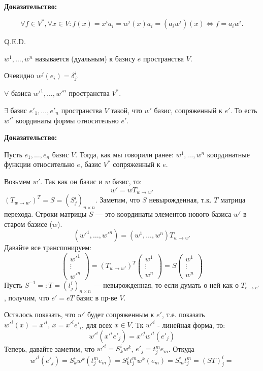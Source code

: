 \textbf{Доказательство:}

$$\forall f \in V^*, \forall x \in V: f(x) = x^ia_i = w^i(x)a_i = (a_iw^i)(x) \Leftrightarrow f = a_iw^i.$$

\hfill Q.E.D.


 $w^1,\ldots, w^n$ называется  (дуальным) к базису $e$ пространства $V$.

Очевидно $w^j(e_i) = \delta^i_j$.


$\forall$ базиса $w'^1,\ldots, w'^n$ пространства $V^*$.

$\exists$ базис $e'_1, \ldots, e'_n$ пространства $V$ такой, что $w'$ базис, сопряженный к $e'$. То есть $w'^{i} $ координаты формы относительно $e'$.

\textbf{Доказательство:}


Пусть $e_1,\dots ,e_n \text{ базис } V$. Тогда, как мы говорили ранее:
$ w^1,\dots,w^n $ координатные функции относительно $e$, базис $V^*$ сопряженный к $e$.

Возьмем $w'$. Так как он базис и $w$ базис, то: $$ w' =wT_{w \rightarrow w'}$$
$(T_{w \to w'})^T=S=(S^i_j)_{n\times n}$. Заметим, что $S$ невырожденная, т.к. $T$ матрица перехода. Строки матрицы $S$ --- это координаты элементов нового базиса $w'$ в старом базисе ($w$).
$$(w'^1,\ldots,w'^n)=(w^1,\ldots,w^n)T_{w \to w'}$$
Давайте все транспонируем:
$$\begin{pmatrix}
    w'^1 \\
    \vdots \\
    {w'}^n
\end{pmatrix} = (T_{w \to w'})^T \begin{pmatrix}
    w^1 \\
    \vdots \\
    {w}^n
\end{pmatrix}= S \begin{pmatrix}
    w^1 \\
    \vdots \\
    {w}^n
\end{pmatrix}$$
Пусть $S^{-1}=:T=(t^i_j)_{n \times n}$ --- невырожденная, то если думать о ней как о $T_{e \to e'}$, получим, что $ e' = eT$ базис в пр-ве $V$.

Осталось показать, что $w'$ будет сопряженным к $e'$, т.е. показать ${w'}^{ i}(x)={x'}^i, \, x = {x'}^i {e'}_i$, для всех $ x \in V$. Тк $w'^i$ - линейная форма, то:
$${w'}^i({x'}^i{e'}_j)= {x'}^j {w'}^i(e'_j)$$
Теперь, давайте заметим, что ${w'}^i=S^i_kw^k$, $e'_j = t^m_je_m$. Откуда 
$$ {w'}^i(e'_j)=  S^i_kw^k(t^m_je_m)  = S_k^jt_{j}^m w^k(e_m) = S^i_mt^m_j=(ST)^i_j = $$

